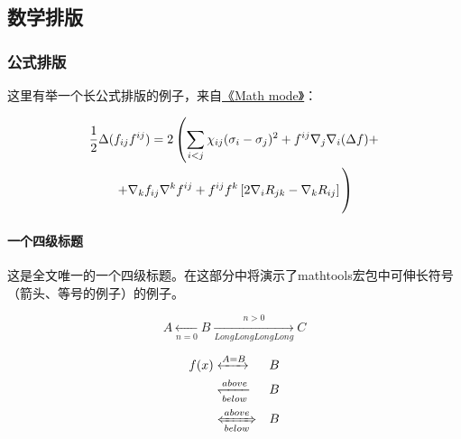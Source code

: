 
\chapter{}
\label{chap:example}

\section{数学排版}
\label{sec:matheq}

\subsection{公式排版}
\label{sec:eqformat}

这里有举一个长公式排版的例子，来自\href{http://www.tex.ac.uk/tex-archive/info/math/voss/mathmode/Mathmode.pdf}{《Math mode》}：

\begin {multline}
  \frac {1}{2}\Delta (f_{ij}f^{ij})=
  2\left (\sum _{i<j}\chi _{ij}(\sigma _{i}-
    \sigma _{j}) ^{2}+ f^{ij}\nabla _{j}\nabla _{i}(\Delta f)+\right .\\
  \left .+\nabla _{k}f_{ij}\nabla ^{k}f^{ij}+
    f^{ij}f^{k}\left [2\nabla _{i}R_{jk}-
      \nabla _{k}R_{ij}\right ]\vphantom {\sum _{i<j}}\right )
\end{multline}

\subsubsection{一个四级标题}
\label{sec:depth4}

这是全文唯一的一个四级标题。在这部分中将演示了mathtools宏包中可伸长符号（箭头、等号的例子）的例子。

\begin{displaymath}
    A \xleftarrow[n=0]{} B \xrightarrow[LongLongLongLong]{n>0} C 
\end{displaymath}

\begin{eqnarray}
  f(x) & \xleftrightarrow[]{A=B}  & B \\
  & \xleftharpoondown[below]{above} & B \nonumber \\
  & \xLeftrightarrow[below]{above} & B
\end{eqnarray}


